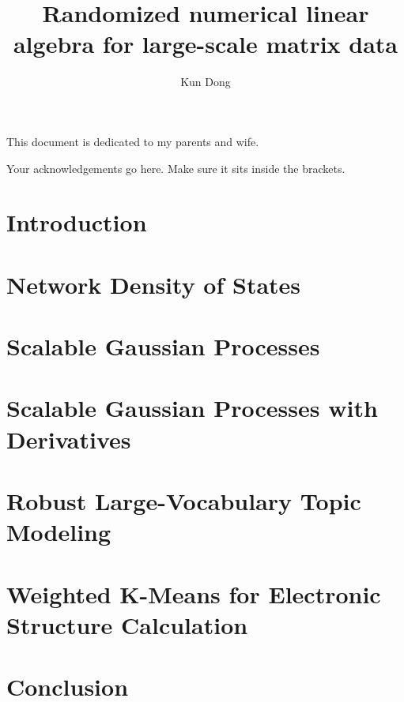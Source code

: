 \documentclass[phd,tocprelim]{cornell}
\title {Randomized numerical linear algebra for large-scale matrix data}
\author {Kun Dong}
\begin{document}
\maketitle
\makecopyright

\begin{abstract}
	
\end{abstract}

\begin{biosketch}
  
\end{biosketch}

\begin{dedication}
This document is dedicated to my parents and wife.
\end{dedication}

\begin{acknowledgements}
Your acknowledgements go here. Make sure it sits inside the brackets.
\end{acknowledgements}

\contentspage
\tablelistpage
\figurelistpage

\normalspacing \setcounter{page}{1} 
\pagestyle{cornell} \addtolength{\parskip}{0.5\baselineskip}

\chapter{Introduction}
	\label{ch1}
	

\chapter{Network Density of States}
	\label{ch2}
	

\chapter{Scalable Gaussian Processes}
	\label{ch3}
	

\chapter{Scalable Gaussian Processes with Derivatives}
	\label{ch4}
	

\chapter{Robust Large-Vocabulary Topic Modeling}
	\label{ch5}
	

\chapter{Weighted K-Means for Electronic Structure Calculation}
	\label{ch6}
	

\chapter{Conclusion}
	\label{ch7}
	




\end{document}
